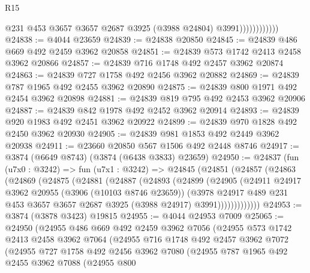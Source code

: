 \begin{lexlean}{R15}
\begin{coremodule}
                            @231
                            @453
                            @3657
                            @3657
                            @2687
                            @3925
                            (@3988 @24804)
                            @3991))))))))))))
@24838 := @4044 @23659
@24839 := @24838 @20850
@24845 := @24839 @486 @669 @492 @2459 @3962 @20858
@24851 := @24839 @573 @1742 @2413 @2458 @3962 @20866
@24857 := @24839 @716 @1748 @492 @2457 @3962 @20874
@24863 := @24839 @727 @1758 @492 @2456 @3962 @20882
@24869 := @24839 @787 @1965 @492 @2455 @3962 @20890
@24875 := @24839 @800 @1971 @492 @2454 @3962 @20898
@24881 := @24839 @819 @795 @492 @2453 @3962 @20906
@24887 := @24839 @842 @1978 @492 @2452 @3962 @20914
@24893 := @24839 @920 @1983 @492 @2451 @3962 @20922
@24899 := @24839 @970 @1828 @492 @2450 @3962 @20930
@24905 := @24839 @981 @1853 @492 @2449 @3962 @20938
@24911 := @23660 @20850 @567 @1506 @492 @2448 @8746
@24917 := @3874 (@6649 @8743) (@3874 (@6438 @3833) @23659)
@24950 := @24837
    (fun (u7x0 : @3242) =>
    fun (u7x1 : @3242) =>
    @24845
      (@24851
        (@24857
          (@24863
            (@24869
              (@24875
                (@24881
                  (@24887
                    (@24893
                      (@24899
                        (@24905
                          (@24911
                            @24917
                            @3962
                            @20955
                            (@3906 (@10103 @8746 @23659))
                            (@3978
                              @24917
                              @489
                              @231
                              @453
                              @3657
                              @3657
                              @2687
                              @3925
                              (@3988 @24917)
                              @3991)))))))))))))
@24953 := @3874 (@3878 @3423) @19815
@24955 := @4044 @24953 @7009
@25065 := @24950
    (@24955
      @486
      @669
      @492
      @2459
      @3962
      @7056
      (@24955
        @573
        @1742
        @2413
        @2458
        @3962
        @7064
        (@24955
          @716
          @1748
          @492
          @2457
          @3962
          @7072
          (@24955
            @727
            @1758
            @492
            @2456
            @3962
            @7080
            (@24955
              @787
              @1965
              @492
              @2455
              @3962
              @7088
              (@24955
                @800

\end{coremodule}
\end{lexlean}

